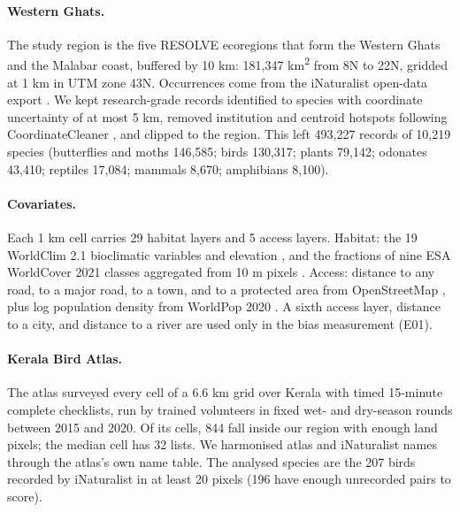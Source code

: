 \documentclass[11pt]{article}
\begin{document}
\paragraph{Western Ghats.} The study region is the five RESOLVE ecoregions that form the Western Ghats and the Malabar coast, buffered by 10 km: 181,347 km\textsuperscript{2} from 8\textdegree{}N to 22\textdegree{}N, gridded at 1 km in UTM zone 43N. Occurrences come from the iNaturalist open-data export \citep{inat}. We kept research-grade records identified to species with coordinate uncertainty of at most 5 km, removed institution and centroid hotspots following CoordinateCleaner \citep{zizka2019}, and clipped to the region. This left 493,227 records of 10,219 species (butterflies and moths 146,585; birds 130,317; plants 79,142; odonates 43,410; reptiles 17,084; mammals 8,670; amphibians 8,100).

\paragraph{Covariates.} Each 1 km cell carries 29 habitat layers and 5 access layers. Habitat: the 19 WorldClim 2.1 bioclimatic variables and elevation \citep{worldclim}, and the fractions of nine ESA WorldCover 2021 classes aggregated from 10 m pixels \citep{worldcover}. Access: distance to any road, to a major road, to a town, and to a protected area from OpenStreetMap \citep{osm}, plus log population density from WorldPop 2020 \citep{worldpop}. A sixth access layer, distance to a city, and distance to a river are used only in the bias measurement (E01).

\paragraph{Kerala Bird Atlas.} The atlas \citep{kbadata} surveyed every cell of a 6.6 km grid over Kerala with timed 15-minute complete checklists, run by trained volunteers in fixed wet- and dry-season rounds between 2015 and 2020. Of its cells, 844 fall inside our region with enough land pixels; the median cell has 32 lists. We harmonised atlas and iNaturalist names through the atlas's own name table. The analysed species are the 207 birds recorded by iNaturalist in at least 20 pixels (196 have enough unrecorded pairs to score).
\end{document}
